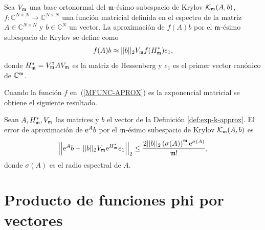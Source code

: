 \begin{definition}\label{def:exp-k-approx}
    \cite{Saad92} Sea $V_{\mathfrak{m}}$ una base ortonormal del $\mathfrak{m}$-ésimo subespacio de Krylov $\mathcal{K}_{\mathfrak{m}}(A,b)$, $f: \mathbb{C}^{N\times N} \to \mathbb{C}^{N\times N}$ una función matricial definida
    en el espectro de la matriz $A\in\mathbb{C}^{N\times N}$ y $b\in\mathbb{C}^{N}$ un vector. La aproximación de $f(A)b$ por el  $\mathfrak{m}$-ésimo subespacio de Krylov se define como
    \begin{equation}
        f(A)b\approx ||b||_2 V_{\mathfrak{m}} f(H^*_{\mathfrak{m}})e_1, \label{MFUNC-APROX}
    \end{equation}
    donde $H_{\mathfrak{m}}^*=V_{\mathfrak{m}}^{\intercal}AV_{\mathfrak{m}}$ es la matriz de Hessenberg y $e_1$ es el primer vector canónico de $\mathbb{C}^{\mathfrak{m}}$.
\end{definition}
Cuando la función $f$ en~(\ref{MFUNC-APROX}) es la exponencial matricial se obtiene el siguiente resultado.
\begin{theorem}\label{exp-bound}
	\cite{Saad92} Sean $A,H^*_{\mathfrak{m}},V_{\mathfrak{m}}$ las matrices y $b$ el vector de la Definición \ref{def:exp-k-approx}. El error de aproximación de $\mathrm{e}^{A}b$ por el $\mathfrak{m}$-ésimo subespacio de Krylov $\mathcal{K}_{\mathfrak{m}}(A,b)$ es
	\begin{equation*}
	\left\lvert\left\lvert \mathrm{e}^{A}b - \lvert\lvert b \rvert\rvert_2 V_{\mathfrak{m}}\mathrm{e}^{H^*_{\mathfrak{m}}}e_1 \right\rvert\right\rvert_2 
	\leq \frac{2\vert\lvert b \rvert\rvert_2 \left( \sigma(A) \right)^{\mathfrak{m}}\mathrm{e}^{\sigma(A)}}{\mathfrak{m}!},
	\end{equation*}
	donde $\sigma(A)$ es el radio espectral de $A$.
\end{theorem}

\section{Producto de funciones phi por vectores}\label{section:phi-times-vector}


